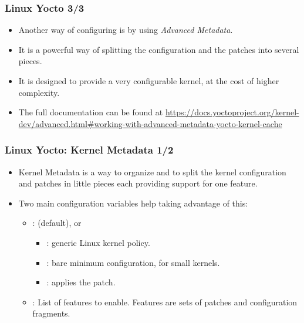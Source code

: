 \begin{frame}
  \frametitle{Linux Yocto 3/3}
  \begin{itemize}
    \item Another way of configuring  is by using
      \emph{Advanced Metadata}.
    \item It is a powerful way of splitting the configuration and the
      patches into several pieces.
    \item It is designed to provide a very configurable kernel, at the cost
      of higher complexity.
    \item The full documentation can be found at
      \url{https://docs.yoctoproject.org/kernel-dev/advanced.html\#working-with-advanced-metadata-yocto-kernel-cache}
  \end{itemize}
\end{frame}

\begin{frame}
  \frametitle{Linux Yocto: Kernel Metadata 1/2}
  \begin{itemize}
    \item Kernel Metadata is a way to organize and to split the
      kernel configuration and patches in little pieces each providing
      support for one feature.
    \item Two main configuration variables help taking advantage of
      this:
      \begin{itemize}
        \item {}:  (default),
           or 
          \begin{itemize}
            \item {}: generic Linux kernel policy.
            \item {}: bare minimum configuration, for small
              kernels.
            \item {}: applies the 
              patch.
          \end{itemize}
        \item {}: List of features to enable. Features
          are sets of patches and configuration fragments.
      \end{itemize}
  \end{itemize}
\end{frame}

